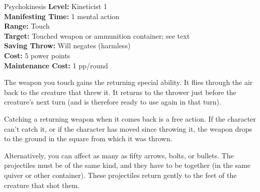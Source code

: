 {Psychokinesis}
{
    \textbf{Level:}
    Kineticist 1\\
    \textbf{Manifesting Time:}
    1 mental action\\
    \textbf{Range:}
    Touch\\
    \textbf{Target:}
    Touched weapon or ammunition container; see text\\
    \textbf{Saving Throw:}
    Will negates (harmless)\\
    \textbf{Cost:}
    5 power points\\
    \textbf{Maintenance Cost:}
    1 pp/round\\
}
{
    The weapon you touch gains the returning special ability. It flies through the air back to the creature that threw it. It returns to the thrower just before the creature's next turn (and is therefore ready to use again in that turn).

    Catching a returning weapon when it comes back is a free action. If the character can't catch it, or if the character has moved since throwing it, the weapon drops to the ground in the square from which it was thrown.

    Alternatively, you can affect as many as fifty arrows, bolts, or bullets. The projectiles must be of the same kind, and they have to be together (in the same quiver or other container). These projectiles return gently to the feet of the creature that shot them.
}
